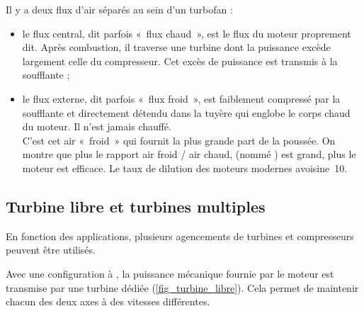 		Il y a deux flux d’air séparés au sein d’un turbofan :

		\begin{itemize}
			\item le flux central, dit parfois «~flux chaud~», est le flux du moteur proprement dit. Après combustion, il traverse une turbine dont la puissance excède largement celle du compresseur. Cet excès de puissance est transmis à la soufflante ;
			\item le flux externe, dit parfois «~flux froid~», est faiblement compressé par la soufflante et directement détendu dans la tuyère qui englobe le corps chaud du moteur. Il n’est jamais chauffé.\\
			C’est cet air «~froid~» qui fournit la plus grande part de la poussée. On montre que plus le rapport air froid / air chaud, (nommé ) est grand, plus le moteur est efficace. Le taux de dilution des moteurs modernes avoisine~\num{10}.
		\end{itemize}
		

	\subsection{Turbine libre et turbines multiples}

		En fonction des applications, plusieurs agencements de turbines et compresseurs peuvent être utilisés.

		Avec une configuration à , la puissance mécanique fournie par le moteur est transmise par une turbine dédiée (\cref{fig_turbine_libre}). Cela permet de maintenir chacun des deux axes à des vitesses différentes.

